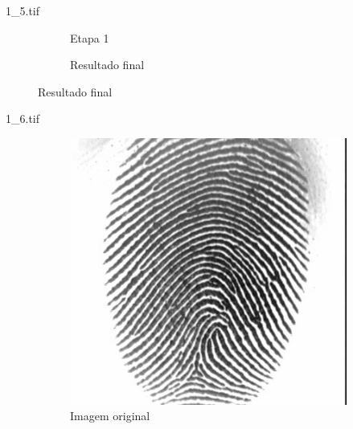 \documentclass{beamer}
\begin{document}
\begin{frame}{1\_5.tif}
\begin{figure}
\begin{subfigure}[!ht]{0.32\textwidth}
                \caption{Etapa 1}
            \end{subfigure}
            \begin{subfigure}[!ht]{0.32\textwidth}
                \caption{Resultado final}
            \end{subfigure}
        \end{figure}
    \end{frame}

    \begin{frame}{1\_6.tif}
        \begin{figure}
            \centering
            \begin{subfigure}[!ht]{0.32\textwidth}
                \includegraphics[width=\columnwidth]{Fingerprints/1_6.jpg}
                \caption{Imagem original}
            \end{subfigure}
            \begin{subfigure}[!ht]{0.32\textwidth}

\end{subfigure}
\end{figure}
\end{frame}
\end{document}
